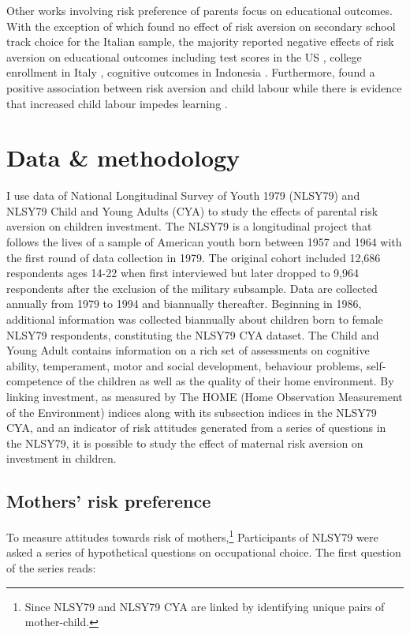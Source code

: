 \documentclass[]{article}
\begin{document}
Other works involving risk preference of parents focus on educational outcomes. With the exception of \citet{leonardi2007parents} which found no effect of risk aversion on secondary school track choice for the Italian sample, the majority reported negative effects of risk aversion on educational outcomes including test scores in the US \citep{brown2012parental}, college enrollment in Italy \citep{checchi2014parents}, cognitive outcomes in Indonesia \citep{hartarto2023parental}. Furthermore, \citet{frempong2021risk} found a positive association between risk aversion and child labour while there is evidence that increased child labour impedes learning \citep{HEADY2003385, bezerra2009impact}.  



\section{Data \& methodology}
I use data of National Longitudinal Survey of Youth 1979 (NLSY79) and NLSY79 Child and Young Adults (CYA) to study the effects of parental risk aversion on children investment. The NLSY79 is a longitudinal project that follows the lives of a sample of American youth born between 1957 and 1964 with the first round of data collection in 1979. The original cohort included 12,686 respondents ages 14-22 when first interviewed but later dropped to 9,964 respondents after the exclusion of the military subsample. Data are collected annually from 1979 to 1994 and biannually thereafter. Beginning in 1986, additional information was collected biannually about children born to female NLSY79 respondents, constituting the NLSY79 CYA dataset. The Child and Young Adult contains information on a rich set of assessments on cognitive ability, temperament, motor and social development, behaviour problems, self-competence of the children as well as the quality of their home environment. By linking investment, as measured by The HOME (Home Observation Measurement of the Environment) indices along with its subsection indices in the NLSY79 CYA, and an indicator of risk attitudes generated from a series of questions in the NLSY79, it is possible to study the effect of maternal risk aversion on investment in children.

\subsection{Mothers' risk preference}
To measure attitudes towards risk of mothers,\footnote{Since NLSY79 and NLSY79 CYA are linked by identifying unique pairs of mother-child.} Participants of NLSY79 were asked a series of hypothetical questions on occupational choice. The first question of the series reads:
\end{document}
